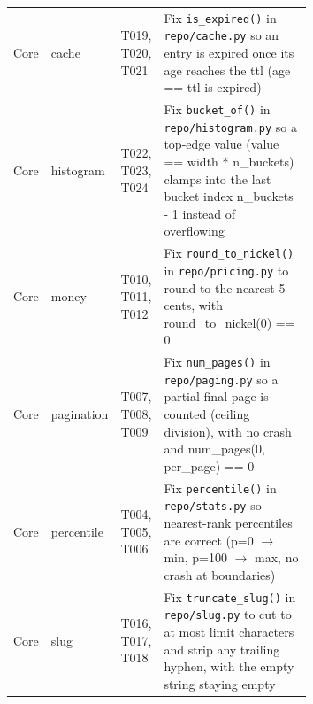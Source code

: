 \begin{small}
\begin{longtable}{@{}llp{0.12\linewidth}p{0.55\linewidth}@{}}
Core & cache & T019, T020, T021 & Fix \texttt{is\_expired()} in \texttt{repo/cache.py} so an entry is expired once its age reaches the ttl (age == ttl is expired) \\
Core & histogram & T022, T023, T024 & Fix \texttt{bucket\_of()} in \texttt{repo/histogram.py} so a top-edge value (value == width * n\_buckets) clamps into the last bucket index n\_buckets - 1 instead of overflowing \\
Core & money & T010, T011, T012 & Fix \texttt{round\_to\_nickel()} in \texttt{repo/pricing.py} to round to the nearest 5 cents, with round\_to\_nickel(0) == 0 \\
Core & pagination & T007, T008, T009 & Fix \texttt{num\_pages()} in \texttt{repo/paging.py} so a partial final page is counted (ceiling division), with no crash and num\_pages(0, per\_page) == 0 \\
Core & percentile & T004, T005, T006 & Fix \texttt{percentile()} in \texttt{repo/stats.py} so nearest-rank percentiles are correct (p=0 $\rightarrow$ min, p=100 $\rightarrow$ max, no crash at boundaries) \\
Core & slug & T016, T017, T018 & Fix \texttt{truncate\_slug()} in \texttt{repo/slug.py} to cut to at most limit characters and strip any trailing hyphen, with the empty string staying empty \\
\end{longtable}
\end{small}
